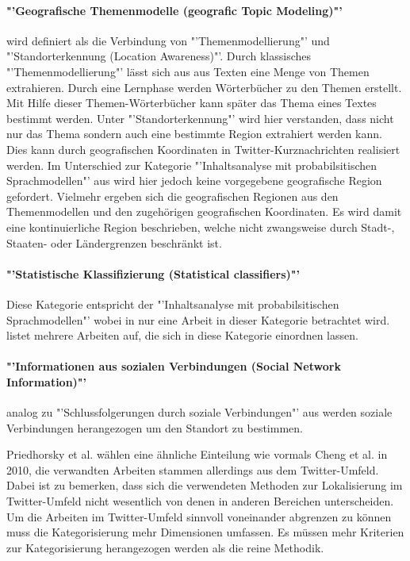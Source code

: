 		\paragraph*{"'Geografische Themenmodelle (geografic Topic Modeling)"'} wird definiert als die Verbindung von "'Themenmodellierung"' und "'Standorterkennung (Location Awareness)"'. 
		Durch klassisches "'Themenmodellierung"' lässt sich aus aus Texten eine Menge von Themen extrahieren. 
		Durch eine Lernphase werden Wörterbücher zu den Themen erstellt.
		Mit Hilfe dieser Themen-Wörterbücher kann später das Thema eines Textes bestimmt werden. \cite{Blei2012} 
		Unter "'Standorterkennung"' wird hier verstanden, dass nicht nur das Thema sondern auch eine bestimmte Region extrahiert werden kann. 
		Dies kann durch geografischen Koordinaten in Twitter-Kurznachrichten realisiert werden. 
		Im Unterschied zur Kategorie "'Inhaltsanalyse mit probabilsitischen Sprachmodellen"' aus \cite{Cheng2010} wird hier jedoch keine vorgegebene geografische Region gefordert. 
		Vielmehr ergeben sich die geografischen Regionen aus den Themenmodellen und den zugehörigen geografischen Koordinaten.
		Es wird damit eine kontinuierliche Region beschrieben, welche nicht zwangsweise durch Stadt-, Staaten- oder Ländergrenzen beschränkt ist.  

		\paragraph*{"'Statistische Klassifizierung (Statistical classifiers)"'} Diese Kategorie entspricht der "'Inhaltsanalyse mit probabilsitischen Sprachmodellen"' wobei in \cite{Cheng2010} nur eine Arbeit in dieser Kategorie betrachtet wird. \cite{Priedhorsky2013} listet mehrere Arbeiten auf, die sich in diese Kategorie einordnen lassen.   

		\paragraph*{"'Informationen aus sozialen Verbindungen (Social Network Information)"'} analog zu "'Schlussfolgerungen durch soziale Verbindungen"' aus \cite{Cheng2010} werden soziale Verbindungen herangezogen um den Standort zu bestimmen. 

		Priedhorsky et al. wählen eine ähnliche Einteilung wie vormals Cheng et al. in 2010, die verwandten Arbeiten stammen allerdings aus dem Twitter-Umfeld. 
		Dabei ist zu bemerken, dass sich die verwendeten Methoden zur Lokalisierung im Twitter-Umfeld nicht wesentlich von denen in anderen Bereichen unterscheiden. 
		Um die Arbeiten im Twitter-Umfeld sinnvoll voneinander abgrenzen zu können muss die Kategorisierung mehr Dimensionen umfassen. 
		Es müssen mehr Kriterien zur Kategorisierung herangezogen werden als die reine Methodik.   

